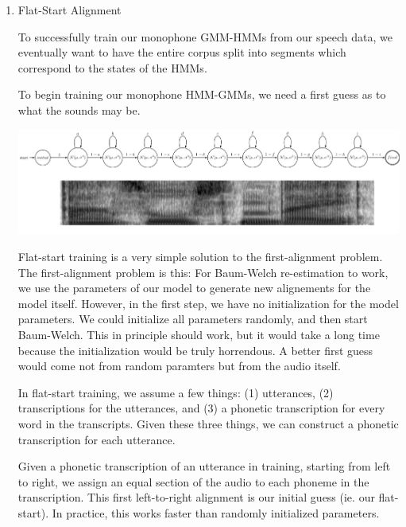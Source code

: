 \documentclass[10pt,a4paper]{article}
\begin{document}
\begin{enumerate}
\item Flat-Start Alignment
  
  To successfully train our monophone GMM-HMMs from our speech data, we eventually want to have the entire corpus split into segments which correspond to the states of the HMMs.
  
  To begin training our monophone HMM-GMMs, we need a first guess as to what the sounds may be.
  
  \begin{center}
    \includegraphics[width=1.0\textwidth,keepaspectratio]{figs/flat-start.png}
  \end{center}
  
  Flat-start training is a very simple solution to the first-alignment problem. The first-alignment problem is this: For Baum-Welch re-estimation to work, we use the parameters of our model to generate new alignements for the model itself. However, in the first step, we have no initialization for the model parameters. We could initialize all parameters randomly, and then start Baum-Welch. This in principle should work, but it would take a long time because the initialization would be truly horrendous. A better first guess would come not from random paramters but from the audio itself.

  In flat-start training, we assume a few things: (1) utterances, (2) transcriptions for the utterances, and (3) a phonetic transcription for every word in the transcripts. Given these three things, we can construct a phonetic transcription for each utterance.  

  Given a phonetic transcription of an utterance in training, starting from left to right, we assign an equal section of the audio to each phoneme in the transcription. This first left-to-right alignment is our initial guess (ie. our flat-start). In practice, this works faster than randomly initialized parameters.
  
  
      

\end{enumerate}
\end{document}
